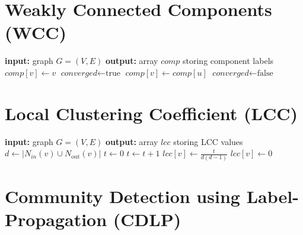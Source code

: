 \clearpage

\section{Weakly Connected Components (WCC)}

\begin{algorithm}[h!]
\begin{algorithmic}[1]
\Statex \textbf{input:} graph $G=(V,E)$
\Statex \textbf{output:} array $\textit{comp}$ storing component labels
  \State $\textit{comp}[v] \gets v$
\EndFor
\Repeat
\State $\textit{converged} \gets \text{true}$
      \State $\textit{comp}[v] \gets \textit{comp}[u]$
      \State $\textit{converged} \gets \text{false}$
     \EndIf
  \EndFor
\EndFor
{}
\end{algorithmic}
\end{algorithm}


\section{Local Clustering Coefficient (LCC)}

\begin{algorithm}[h!]
\begin{algorithmic}[1]
\Statex \textbf{input:} graph $G=(V,E)$
\Statex \textbf{output:} array $\textit{lcc}$ storing LCC values
   \State $d \gets |N_{in}(v) \cup N_\mathrm{out}(v)|$
  \State $t \gets 0$
      \State $t  \gets t + 1$
     \EndIf
    \EndFor
  \EndFor
    \State $\textit{lcc}[v] \gets \frac{t}{d(d-1)} $
  \Else
    \State $\textit{lcc}[v] \gets 0$
  \EndIf
\EndFor
\end{algorithmic}
\end{algorithm}

\clearpage

\section{Community Detection using Label-Propagation (CDLP)}

